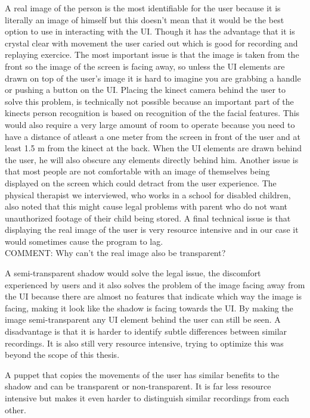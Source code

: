  
 A real image of the person is the most identifiable for the user because it is literally an image of himself but this doesn't mean that it would be the best option to use in interacting with the UI. Though it has the advantage that it is crystal clear with movement the user caried out which is good for recording and replaying exercice. The most important issue is that the image is taken from the front so the image of the screen is facing away, so unless the UI elements are drawn on top of the user's image it is hard to imagine you are grabbing a handle or pushing a button on the UI. Placing the kinect camera behind the user to solve this problem, is technically not possible because an important part of the kinects person recognition is based on recognition of the the facial features. This would also require a very large amount of room to operate because you need to have a distance of atleast a one meter from the screen in front of the user and at least 1.5 m from the kinect at the back. When the UI elements are drawn behind the user, he will also obscure any elements directly behind him. Another issue is that most people are not comfortable with an image of themselves being displayed on the screen which could detract from the user experience. The physical therapist we interviewed, who works in a school for disabled children, also noted that this might cause legal problems with parent who do not want unauthorized footage of their child being stored. A final technical issue is that displaying the real image of the user is very resource intensive and in our case it would sometimes cause the program to lag. \\
 {\large COMMENT: Why can't the real image also be transparent?}
 
 A semi-transparent shadow would solve the legal issue, the discomfort experienced by users and it also solves the problem of the image facing away from the UI because there are almost no features that indicate which way the image is facing, making it look like the shadow is facing towards the UI. By making the image semi-transparent any UI element behind the user can still be seen. A disadvantage is that it is harder to identify subtle differences between similar recordings. It is also still very resource intensive, trying to optimize this was beyond the scope of this thesis.
 
 
 A puppet that copies the movements of the user has similar benefits to the shadow and can be transparent or non-transparent. It is far less resource intensive but makes it even harder to distinguish similar recordings from each other.
 
